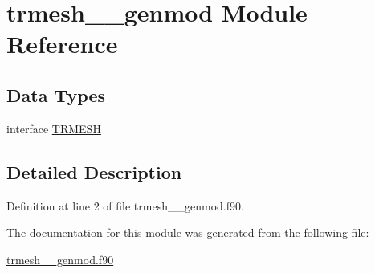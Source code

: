 \hypertarget{classtrmesh____genmod}{\section{trmesh\+\_\+\+\_\+genmod Module Reference}
\label{classtrmesh____genmod}
}
\subsection*{Data Types}
\begin{DoxyCompactItemize}
\item 
interface \hyperlink{interfacetrmesh____genmod_1_1TRMESH}{T\+R\+M\+E\+S\+H}
\end{DoxyCompactItemize}


\subsection{Detailed Description}


Definition at line 2 of file trmesh\+\_\+\+\_\+genmod.\+f90.



The documentation for this module was generated from the following file\+:\begin{DoxyCompactItemize}
\item 
\hyperlink{trmesh____genmod_8f90}{trmesh\+\_\+\+\_\+genmod.\+f90}\end{DoxyCompactItemize}

